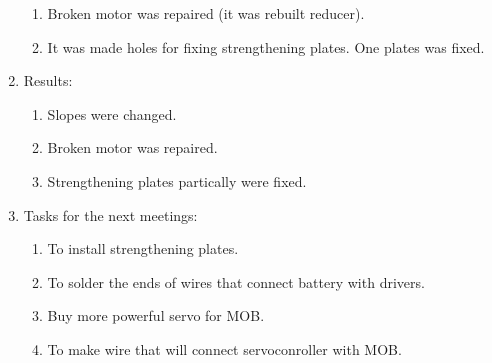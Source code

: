 \begin{enumerate}
\begin{enumerate}
		\item Broken motor was repaired (it was rebuilt reducer).
		
		\item It was made holes for fixing strengthening plates. One plates was fixed.
		
	\end{enumerate}
	
	\item Results:
	\begin{enumerate}
		
		\item Slopes were changed.
		
		\item Broken motor was repaired.
		
		\item Strengthening plates partically were fixed.
		
	\end{enumerate}
	
	\item Tasks for the next meetings:
	\begin{enumerate}
		
		\item To install strengthening plates.
		
	    \item To solder the ends of wires that connect battery with drivers.
	    
	    \item Buy more powerful servo for MOB.
	    
	    \item To make wire that will connect servoconroller with MOB.
		 
	\end{enumerate}
	
\end{enumerate}
\fillpage